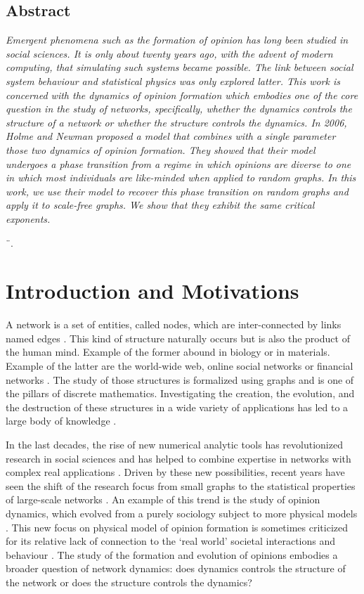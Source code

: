 \documentclass[11pt]{article}
\begin{document}
\begin{center}
 \section*{Abstract}
 \parbox{0.9\linewidth}{\textit{Emergent phenomena such as the formation of opinion has long been studied in social sciences. It is only about twenty years ago, with the advent of modern computing, that simulating such systems became possible. The link between social system behaviour and statistical physics was only explored latter. This work is concerned with the dynamics of opinion formation which embodies one of the core question in the study of networks, specifically, whether the dynamics controls the structure of a network or whether the structure controls the dynamics. In 2006, Holme and Newman proposed a model that combines with a single parameter those two dynamics of opinion formation. They showed that their model undergoes a phase transition from a regime in which opinions are diverse to one in which most individuals are like-minded when applied to random graphs. In this work, we use their model to recover this phase transition on random graphs and apply it to scale-free graphs. We show that they exhibit the same critical exponents.}}
\end{center}¨.


\section{Introduction and Motivations}

A network is a set of entities, called nodes, which are inter-connected by links named edges \citep{Newman2003}. This kind of structure naturally occurs but is also the product of the human mind. Example of the former abound in biology or in materials. Example of the latter are the world-wide web, online social networks or financial networks \citep{Social_Network_book}. The study of those structures is formalized using graphs and is one of the pillars of discrete mathematics. Investigating the creation, the evolution, and the destruction of these structures in a wide variety of applications has led to a large body of knowledge \citep{Opinion_dynamics, Acemoglu2011}.

In the last decades, the rise of new numerical analytic tools has revolutionized research in social sciences and has helped to combine expertise in networks with complex real applications \citep{Social_Network_book}. Driven by these new possibilities, recent years have seen the shift of the research focus from small graphs to the statistical properties of large-scale networks \citep{Application, EcoloAppli}. An example of this trend is the study of opinion dynamics, which evolved from a purely sociology subject to more physical models \citep{Holme2002, Proskurnikov2016, Parsegov2017}. This new focus on physical model of opinion formation is sometimes criticized for its relative lack of connection to the `real world' societal interactions and behaviour \citep{Sobkowicz2009}. The study of the formation and evolution of opinions embodies a broader question of network dynamics: does dynamics controls the structure of the network or does the structure controls the dynamics?
\end{document}
